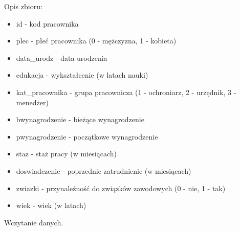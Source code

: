 \documentclass[]{book}
\newenvironment{Shaded}{\begin{snugshade}}{\end{snugshade}}
\newcommand{\KeywordTok}[1]{\textcolor[rgb]{0.13,0.29,0.53}{\textbf{#1}}}
\newcommand{\DataTypeTok}[1]{\textcolor[rgb]{0.13,0.29,0.53}{#1}}
\newcommand{\StringTok}[1]{\textcolor[rgb]{0.31,0.60,0.02}{#1}}
\newcommand{\OperatorTok}[1]{\textcolor[rgb]{0.81,0.36,0.00}{\textbf{#1}}}
\newcommand{\NormalTok}[1]{#1}
\providecommand{\tightlist}{%
  \setlength{\itemsep}{0pt}\setlength{\parskip}{0pt}}
\begin{document}
Opis zbioru:

\begin{itemize}
\tightlist
\item
  id - kod pracownika
\item
  plec - płeć pracownika (0 - mężczyzna, 1 - kobieta)
\item
  data\_urodz - data urodzenia
\item
  edukacja - wykształcenie (w latach nauki)
\item
  kat\_pracownika - grupa pracownicza (1 - ochroniarz, 2 - urzędnik, 3 -
  menedżer)
\item
  bwynagrodzenie - bieżące wynagrodzenie
\item
  pwynagrodzenie - początkowe wynagrodzenie
\item
  staz - staż pracy (w miesiącach)
\item
  doswiadczenie - poprzednie zatrudnienie (w miesiącach)
\item
  zwiazki - przynależność do związków zawodowych (0 - nie, 1 - tak)
\item
  wiek - wiek (w latach)
\end{itemize}

Wczytanie danych.

\begin{Shaded}
\end{Shaded}
\end{document}
